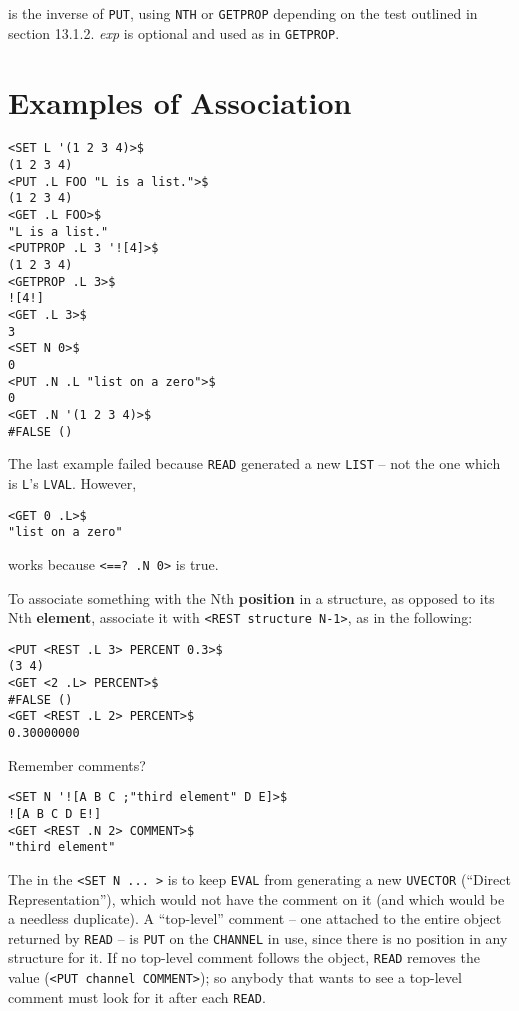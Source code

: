 \documentclass[a4paper]{scrbook}
\begin{document}
 is the inverse of \texttt{PUT}, using \texttt{NTH} or \texttt{GETPROP} depending on the test
outlined in section 13.1.2. \emph{exp} is optional and used as in \texttt{GETPROP}.

\section{Examples of Association}\label{examples-of-association}

\begin{verbatim}
<SET L '(1 2 3 4)>$
(1 2 3 4)
<PUT .L FOO "L is a list.">$
(1 2 3 4)
<GET .L FOO>$
"L is a list."
<PUTPROP .L 3 '![4]>$
(1 2 3 4)
<GETPROP .L 3>$
![4!]
<GET .L 3>$
3
<SET N 0>$
0
<PUT .N .L "list on a zero">$
0
<GET .N '(1 2 3 4)>$
#FALSE ()
\end{verbatim}

The last example failed because \texttt{READ}  generated a new \texttt{LIST} -- not the one which is
\texttt{L}'s \texttt{LVAL}. However,

\begin{verbatim}
<GET 0 .L>$
"list on a zero"
\end{verbatim}

works because \texttt{\textless{}==?\ .N\ 0\textgreater{}} is true.

To associate something with the Nth \textbf{position} in a structure, as opposed to its Nth \textbf{element}, associate it
with \texttt{\textless{}REST\ structure\ N-1\textgreater{}}, as in the following:

\begin{verbatim}
<PUT <REST .L 3> PERCENT 0.3>$
(3 4)
<GET <2 .L> PERCENT>$
#FALSE ()
<GET <REST .L 2> PERCENT>$
0.30000000
\end{verbatim}

Remember comments? 

\begin{verbatim}
<SET N '![A B C ;"third element" D E]>$
![A B C D E!]
<GET <REST .N 2> COMMENT>$
"third element"
\end{verbatim}

The \texttt{\textquotesingle{}} in the \texttt{\textless{}SET\ N\ ...\ \textgreater{}} is to keep \texttt{EVAL} from
generating a new \texttt{UVECTOR} (``Direct Representation''), which would not have the comment on it (and which would be a
needless duplicate). A ``top-level'' comment -- one attached to the entire object returned by \texttt{READ} -- is
\texttt{PUT} on the \texttt{CHANNEL}  in use, since there is no position in any structure for it.
If no top-level comment follows the object, \texttt{READ} removes the value
(\texttt{\textless{}PUT\ channel\ COMMENT\textgreater{}}); so anybody that wants to see a top-level comment must look for
it after each \texttt{READ}.
\end{document}
